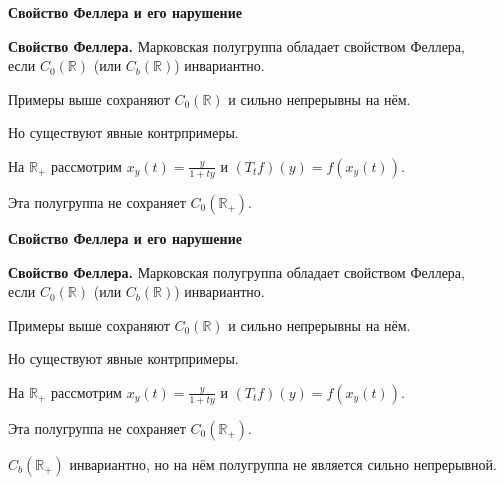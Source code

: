 \documentclass[11pt]{article}
\newcommand{\R}{\mathbb{R}}
\begin{document}
\begin{center}
{\color{notaeYELLOW}\bfseries\fontsize{44}{52}\selectfont Свойство Феллера и его нарушение}
\end{center}
\vspace*{\fill}
\begin{center}
\fontsize{36}{43}\selectfont
\parbox{\linewidth}{\centering\noindent \textbf{Свойство Феллера.} Марковская полугруппа обладает свойством Феллера,\\ если $C_0(\R)$ (или $C_b(\R)$) инвариантно.
\par}\vspace{0.4in}
\parbox{\linewidth}{\centering\noindent Примеры выше сохраняют $C_0(\R)$ и сильно непрерывны на нём.
\par}\vspace{0.4in}
\parbox{\linewidth}{\centering\noindent Но существуют явные контрпримеры.
\par}\vspace{0.4in}
\parbox{\linewidth}{\centering\noindent На $\R_+$ рассмотрим $x_y(t)=\frac{y}{1+ty}$ и $(T_t f)(y)=f(x_y(t))$.
\par}\vspace{0.4in}
\parbox{\linewidth}{\centering\noindent Эта полугруппа не сохраняет $C_0(\R_+)$.
\par}\vspace{0.4in}
\end{center}
\vspace*{\fill}

\newpage

\begin{center}
{\color{notaeYELLOW}\bfseries\fontsize{44}{52}\selectfont Свойство Феллера и его нарушение}
\end{center}
\vspace*{\fill}
\begin{center}
\fontsize{36}{43}\selectfont
\parbox{\linewidth}{\centering\noindent \textbf{Свойство Феллера.} Марковская полугруппа обладает свойством Феллера,\\ если $C_0(\R)$ (или $C_b(\R)$) инвариантно.
\par}\vspace{0.4in}
\parbox{\linewidth}{\centering\noindent Примеры выше сохраняют $C_0(\R)$ и сильно непрерывны на нём.
\par}\vspace{0.4in}
\parbox{\linewidth}{\centering\noindent Но существуют явные контрпримеры.
\par}\vspace{0.4in}
\parbox{\linewidth}{\centering\noindent На $\R_+$ рассмотрим $x_y(t)=\frac{y}{1+ty}$ и $(T_t f)(y)=f(x_y(t))$.
\par}\vspace{0.4in}
\parbox{\linewidth}{\centering\noindent Эта полугруппа не сохраняет $C_0(\R_+)$.
\par}\vspace{0.4in}
\parbox{\linewidth}{\centering\noindent $C_b(\R_+)$ инвариантно, но на нём полугруппа не является сильно непрерывной.
\par}\vspace{0.4in}
\end{center}
\vspace*{\fill}
\end{document}
